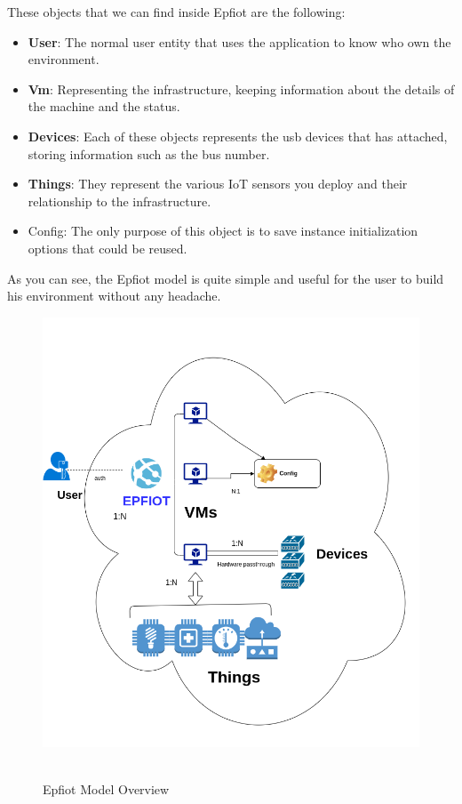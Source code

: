 These objects that we can find inside Epfiot are the following:
\begin{itemize}
    \item \textbf{User}: The normal user entity that uses the application to know who own the environment.
    \item \textbf{Vm}: Representing the infrastructure, keeping information about the details of the machine and the status.
    \item \textbf{Devices}: Each of these objects represents the usb devices that has attached, storing information such as the bus number.
    \item \textbf{Things}: They represent the various IoT sensors you deploy and their relationship to the infrastructure.
    \item Config: The only purpose of this object is to save instance initialization options that could be reused.
\end{itemize}
\newpage

As you can see, the Epfiot model is quite simple and useful for the user to build his environment without any headache.


\begin{figure}[h!]%
\centering
    \includegraphics[width=6.0in]{figures/core_model.png}
~\caption{Epfiot Model Overview}
\label{figure4.6}
\end{figure}
\newpage


